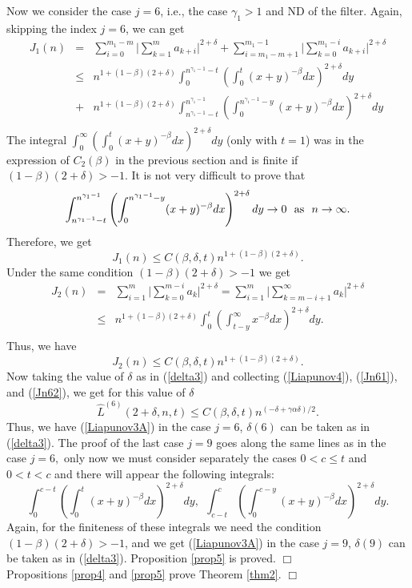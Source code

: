 \documentclass[12pt]{article}
\def\a{\alpha}
\def\b{\beta}
\def\d{\delta}
\def\g{\gamma}
\newcommand{\halmos}{\vspace{3mm} \hfill \mbox{$\Box$}\\[2mm]}
\theoremstyle{plain}
\theoremstyle{definition}
\begin{document}
Now we consider the case $j=6$, i.e., the case $\g_1>1$ and ND of the filter. Again, skipping the index $j=6$, we can get
\begin{eqnarray*}
J_1(n) &=& \sum_{i=0}^{m_1-m} \Big | \sum_{k=1}^{m} a_{k+i} \Big |^{2+\d} +\sum_{i=m_1-m+1}^{m_1-1} \Big | \sum_{k=0}^{m_1-i} a_{k+i} \Big |^{2+\d} \nonumber \\
       &\le & n^{1+(1-\b)(2+\d)} \int_0^{n^{\g_1-1}-t}\left (\int_0^{t}(x+y)^{-\b} dx\right )^{2+\d} dy \nonumber \\
       &+&  n^{1+(1-\b)(2+\d)} \int_{n^{\g_1-1}-t}^{n^{\g_1-1}} \left (\int_0^{n^{\g_1-1}-y}(x+y)^{-\b} dx\right )^{2+\d} dy   \nonumber \\
\end{eqnarray*}
The integral $ \int_0^{\infty}\left (\int_0^{t}(x+y)^{-\b} dx\right )^{2+\d} dy $ (only with $t=1$) was in the expression of $C_2(\b)$ in the previous section and is finite if $(1-\b)(2+\d)>-1$. It is not very difficult to prove that
$$
\int_{n^{\g_1-1}-t}^{n^{\g_1-1}} \left (\int_0^{n^{\g_1-1}-y}(x+y)^{-\b} dx\right )^{2+\d} dy \to 0 \  \ {\rm as} \ \ n\to \infty.
$$
Therefore, we get
\begin{equation}\label{Jn61}
J_1(n)   \le C(\b, \d, t)n^{1+(1-\b)(2+\d)}.
\end{equation}
Under the same condition $(1-\b)(2+\d)>-1$ we get
\begin{eqnarray*}
J_2(n) &=& \sum_{i=1}^{m} \big |\sum_{k=0}^{m-i} a_{k} \big |^{2+\d}=\sum_{i=1}^{m} \big |\sum_{k=m-i+1}^{\infty} a_{k} \big |^{2+\d} \nonumber \\
     &\le & n^{1+(1-\b)(2+\d)}\int_0^t\left (\int_{t-y}^\infty x^{-\b} dx\right )^{2+\d} dy. \nonumber \\
\end{eqnarray*}
Thus, we have
\begin{equation}\label{Jn62}
J_2(n)   \le C(\b, \d, t)n^{1+(1-\b)(2+\d)}.
\end{equation}
Now taking the value of $\d$ as in (\ref{delta3}) and collecting (\ref{Liapunov4}), (\ref{Jn61}), and (\ref{Jn62}),  we get for this value of $\d$
$$
{\hat L}^{(6)}(2+\d,n, t)\le C(\b, \d, t)n^{(-\d +\g\a\d)/2}.
$$
Thus, we have (\ref{Liapunov3A}) in the case $j=6$, $\d(6)$ can be taken as in (\ref{delta3}). The proof of the last case $j=9$ goes along the same lines as in the case $j=6,$ only now we must consider separately the cases $0<c\le t$ and $0<t<c$ and there will  appear the following integrals:
$$
\int_0^{c-t}\left (\int_0^{t}(x+y)^{-\b} dx\right )^{2+\d} dy, \ \  \int_{c-t}^{c} \left (\int_0^{c-y}(x+y)^{-\b} dx\right )^{2+\d} dy.
$$
Again, for the finiteness of these integrals we need the condition $(1-\b)(2+\d)>-1$, and we get (\ref{Liapunov3A}) in the case $j=9$, $\d(9)$ can be taken as in (\ref{delta3}). Proposition \ref{prop5} is proved.
\halmos
Propositions \ref{prop4} and \ref{prop5} prove Theorem \ref{thm2}.
\halmos
\end{document}
